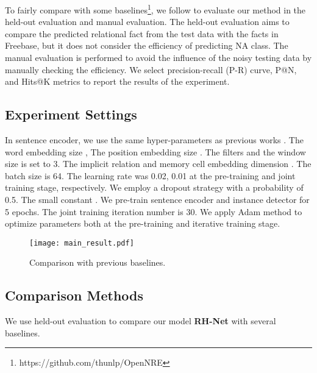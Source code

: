 \documentclass{article}
\begin{document}
To fairly compare with some baselines\footnote{https://github.com/thunlp/OpenNRE}, we follow \cite{Lin2016Neural} to evaluate our method in the held-out evaluation and manual evaluation. The held-out evaluation aims to compare the predicted relational fact from the test data with the facts in Freebase, but it does not consider the efficiency of predicting NA class. The manual evaluation is performed to avoid the influence of the noisy testing data by manually checking the efficiency. We select precision-recall (P-R) curve, P@N, and Hits@K metrics to report the results of the experiment.

\subsection{Experiment Settings}

In sentence encoder, we use the same hyper-parameters as previous works \cite{Zeng2015Distant}. The word embedding size , The position embedding size . The filters  and the window size  is set to 3. The implicit relation and memory cell embedding dimension . The batch size is 64. The learning rate was 0.02, 0.01 at the pre-training and joint training stage, respectively. We employ a dropout strategy with a probability of 0.5. The small constant . We pre-train sentence encoder and instance detector for 5 epochs. The joint training iteration number  is 30. We apply Adam \cite{kingma2014adam} method to optimize parameters both at the pre-training and iterative training stage.

\begin{figure}[t]
\centerline{\texttt{[image: main\_result.pdf]}}
\caption{Comparison with previous baselines.}
\label{main result}
\end{figure}

\subsection{Comparison Methods}

We use held-out evaluation to compare our model \textbf{RH-Net} with several baselines. 
\end{document}
